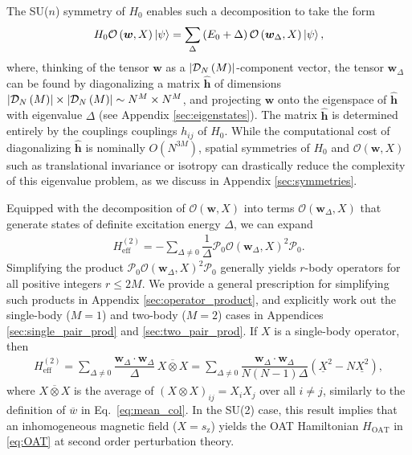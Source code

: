 \documentclass[nofootinbib,notitlepage,11pt]{revtex4-2}
\renewcommand{\t}{\text} %
\newcommand{\f}[2]{\dfrac{#1}{#2}} %
\newcommand{\p}[1]{\left(#1\right)} %
\renewcommand{\c}{\cdot} %
\newcommand{\m}{\bm} %
\newcommand{\1}{\mathds{1}}
\newcommand{\z}{\text{z}}
\newcommand{\D}{\mathcal{D}}
\renewcommand{\O}{\mathcal{O}}
\renewcommand{\P}{\mathcal{P}}
\newcommand{\col}{\underline}
\newcommand{\mean}{\overline}
\begin{document}
The SU($n$) symmetry of $H_0$ enables such a decomposition to take the form
\begin{align}
  H_0 \O\p{\m w,X} \ket\psi
  = \sum_\Delta \p{E_0+\Delta} \O\p{\m w_\Delta,X} \ket\psi,
  \label{eq:excitation}
\end{align}
where, thinking of the tensor $\m w$ as a $\abs{\D_N\p{M}}$-component vector, the tensor $\m w_\Delta$ can be found by diagonalizing a matrix $\hat{\m h}$ of dimensions $\abs{\D_N\p{M}}\times\abs{\D_N\p{M}}\sim N^M\times N^M$, and projecting $\m w$ onto the eigenspace of $\hat{\m h}$ with eigenvalue $\Delta$ (see Appendix \ref{sec:eigenstates}).
The matrix $\hat{\m h}$ is determined entirely by the couplings couplings $h_{ij}$ of $H_0$.
While the computational cost of diagonalizing $\hat{\m h}$ is nominally $O\p{N^{3M}}$, spatial symmetries of $H_0$ and $\O\p{\m w,X}$ such as translational invariance or isotropy can drastically reduce the complexity of this eigenvalue problem, as we discuss in Appendix \ref{sec:symmetries}.

Equipped with the decomposition of $\O\p{\m w,X}$ into terms $\O\p{\m w_\Delta,X}$ that generate states of definite excitation energy $\Delta$, we can expand
\begin{align}
  H_{\t{eff}}^{(2)} = -\sum_{\Delta\ne0} \f1\Delta
  \P_0 \O\p{\m w_\Delta,X}^2 \P_0.
\end{align}
Simplifying the product $\P_0 \O\p{\m w_\Delta,X}^2 \P_0$ generally yields $r$-body operators for all positive integers $r\le2M$.
We provide a general prescription for simplifying such products in Appendix \ref{sec:operator_product}, and explicitly work out the single-body ($M=1$) and two-body ($M=2$) cases in Appendices \ref{sec:single_pair_prod} and \ref{sec:two_pair_prod}.
If $X$ is a single-body operator, then
\begin{align}
  H_{\t{eff}}^{(2)}
  = \sum_{\Delta\ne0} \f{\m w_\Delta\c\m w_\Delta}{\Delta} \,
  \mean{X\otimes X}
  = \sum_{\Delta\ne0} \f{\m w_\Delta\c\m w_\Delta}{N\p{N-1}\Delta}
  \p{\col{X}^2 - N \col{X^2}},
  \label{eq:H_eff_2_1}
\end{align}
where $\mean{X\otimes X}$ is the average of $\p{X\otimes X}_{ij}=X_iX_j$ over all $i\ne j$, similarly to the definition of $\mean{w}$ in Eq.~\eqref{eq:mean_col}.
In the SU(2) case, this result implies that an inhomogeneous magnetic field ($X=s_\z$) yields the OAT Hamiltonian $H_{\t{OAT}}$ in \eqref{eq:OAT} at second order perturbation theory.

\end{document}
